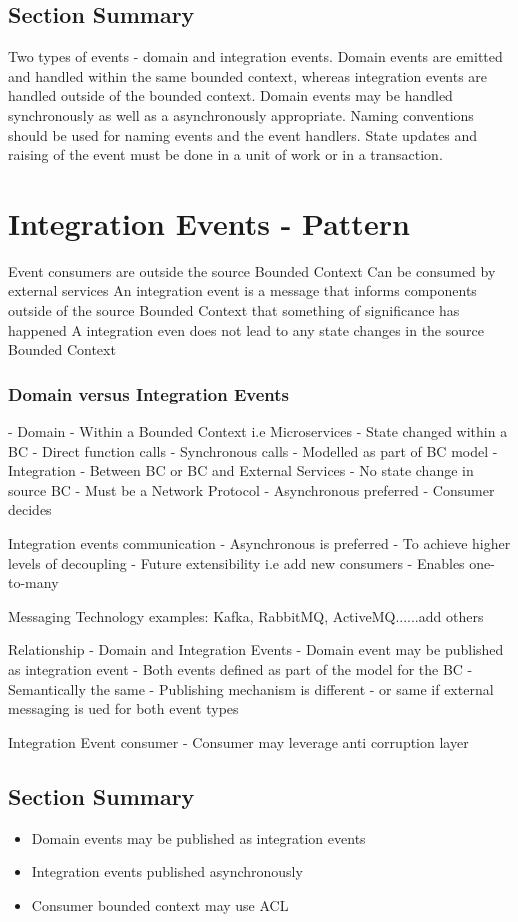 \subsection{Section Summary}
Two types of events - domain and integration events.
Domain events are emitted and handled within the same bounded context, whereas integration events are handled outside of the bounded context.
Domain events may be handled synchronously as well as a asynchronously appropriate.
Naming conventions should be used for naming events and the event handlers.
State updates and raising of the event must be done in a unit of work or in a transaction.


\section{Integration Events - Pattern}
Event consumers are outside the source Bounded Context
Can be consumed by external services
An integration event is a message that informs components outside of the source Bounded Context that something of significance has happened
A integration even does not lead to any state changes in the source Bounded Context

\subsubsection{Domain versus Integration Events}
- Domain
- Within a Bounded Context i.e Microservices
- State changed within a BC
- Direct function calls
- Synchronous calls
- Modelled as part of BC model
- Integration
- Between BC or BC and External Services
- No state change in source BC
- Must be a Network Protocol
- Asynchronous preferred
- Consumer decides

Integration events communication
- Asynchronous is preferred
- To achieve higher levels of decoupling
- Future extensibility i.e add new consumers
- Enables one-to-many

Messaging Technology examples: Kafka, RabbitMQ, ActiveMQ......add others

Relationship - Domain and Integration Events
- Domain event may be published as integration event
- Both events defined as part of the model for the BC
- Semantically the same
- Publishing mechanism is different - or same if external messaging is ued for both event types

Integration Event consumer
- Consumer may leverage anti corruption layer

\subsection{Section Summary}
\begin{itemize}
    \item Domain events may be published as integration events
    \item Integration events published asynchronously
    \item Consumer bounded context may use ACL
\end{itemize}


